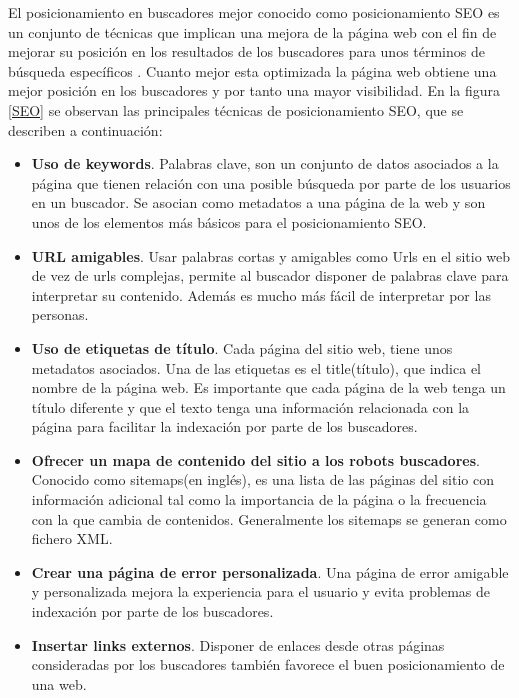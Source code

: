 El posicionamiento en buscadores mejor conocido como posicionamiento SEO es un conjunto de técnicas que implican una mejora de la página web con el fin de mejorar su posición en los resultados de los buscadores para unos términos de búsqueda específicos \cite{SEO}. Cuanto mejor esta optimizada la página web obtiene una mejor posición en los buscadores y por tanto una mayor visibilidad. En la figura \ref{SEO} se observan las principales técnicas de posicionamiento SEO, que se describen a continuación:

\begin{itemize}

\item \textbf{Uso de keywords}. Palabras clave, son un conjunto de datos asociados a la página que tienen relación con una posible búsqueda por parte de los usuarios en un buscador. Se asocian como metadatos a una página de la web y son unos de los elementos más básicos para el posicionamiento SEO.

\item \textbf{URL amigables}. Usar palabras cortas y amigables como Urls en el sitio web de vez de urls complejas, permite al buscador disponer de palabras clave para interpretar su contenido. Además es mucho más fácil de interpretar por las personas.

\item \textbf{Uso de etiquetas de título}. Cada página del sitio web, tiene unos metadatos asociados. Una de las etiquetas es el title(título), que indica el nombre de la página web. Es importante que cada página de la web tenga un título diferente y que el texto tenga una información relacionada con la página para facilitar la indexación por parte de los buscadores.

\item \textbf{Ofrecer un mapa de contenido del sitio a los robots buscadores}. Conocido como sitemaps(en inglés), es una lista de las páginas del sitio con información adicional tal como la importancia de la página o la frecuencia con la que cambia de contenidos. Generalmente los sitemaps se generan como fichero XML.

\item \textbf{Crear una página de error personalizada}. Una página de error amigable y personalizada mejora la experiencia para el usuario y evita problemas de indexación por parte de los buscadores.

\item \textbf{Insertar links externos}. Disponer de enlaces desde otras páginas consideradas por los buscadores también favorece  el buen posicionamiento de una web.


\end{itemize}
